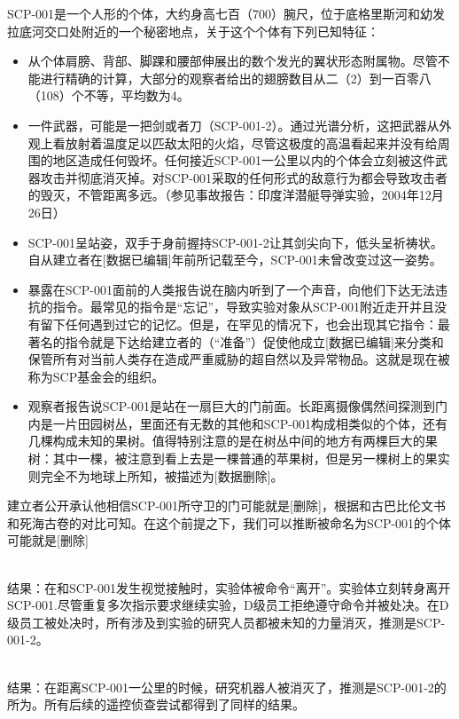 SCP-001是一个人形的个体，大约身高七百（700）腕尺，位于底格里斯河和幼发拉底河交口处附近的一个秘密地点，关于这个个体有下列已知特征：

\begin{itemize}
\item 从个体肩膀、背部、脚踝和腰部伸展出的数个发光的翼状形态附属物。尽管不能进行精确的计算，大部分的观察者给出的翅膀数目从二（2）到一百零八（108）个不等，平均数为4。
\item 一件武器，可能是一把剑或者刀（SCP-001-2）。通过光谱分析，这把武器从外观上看放射着温度足以匹敌太阳的火焰，尽管这极度的高温看起来并没有给周围的地区造成任何毁坏。任何接近SCP-001一公里以内的个体会立刻被这件武器攻击并彻底消灭掉。对SCP-001采取的任何形式的敌意行为都会导致攻击者的毁灭，不管距离多远。（参见事故报告：印度洋潜艇导弹实验，2004年12月26日）
\item SCP-001呈站姿，双手于身前握持SCP-001-2让其剑尖向下，低头呈祈祷状。自从建立者在{[}数据已编辑]年前所记载至今，SCP-001未曾改变过这一姿势。
\item 暴露在SCP-001面前的人类报告说在脑内听到了一个声音，向他们下达无法违抗的指令。最常见的指令是“忘记”，导致实验对象从SCP-001附近走开并且没有留下任何遇到过它的记忆。但是，在罕见的情况下，也会出现其它指令：最著名的指令就是下达给建立者的（“准备”）促使他成立{[}数据已编辑]来分类和保管所有对当前人类存在造成严重威胁的超自然以及异常物品。这就是现在被称为SCP基金会的组织。
\item 观察者报告说SCP-001是站在一扇巨大的门前面。长距离摄像偶然间探测到门内是一片田园树丛，里面还有无数的其他和SCP-001构成相类似的个体，还有几棵构成未知的果树。值得特别注意的是在树丛中间的地方有两棵巨大的果树：其中一棵，被注意到看上去是一棵普通的苹果树，但是另一棵树上的果实则完全不为地球上所知，被描述为{[}数据删除]。
\end{itemize}

建立者公开承认他相信SCP-001所守卫的门可能就是{[}删除]，根据和古巴比伦文书和死海古卷的对比可知。在这个前提之下，我们可以推断被命名为SCP-001的个体可能就是{[}删除]

\hr


\\
结果：在和SCP-001发生视觉接触时，实验体被命令“离开”。实验体立刻转身离开SCP-001.尽管重复多次指示要求继续实验，D级员工拒绝遵守命令并被处决。在D级员工被处决时，所有涉及到实验的研究人员都被未知的力量消灭，推测是SCP-001-2。

\\
结果：在距离SCP-001一公里的时候，研究机器人被消灭了，推测是SCP-001-2的所为。所有后续的遥控侦查尝试都得到了同样的结果。

